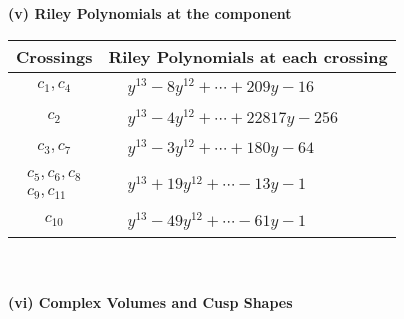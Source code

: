 \documentclass[1p]{elsarticle_modified}
\theoremstyle{definition}
\begin{document}
\newpage\renewcommand{\arraystretch}{1}
\flushleft \textbf{(v) Riley Polynomials at the component}\newline \\
\begin{tabular}{m{50pt}|m{274pt}}
Crossings & \hspace{64pt}Riley Polynomials at each crossing \\
\hline $$\begin{aligned}c_{1},c_{4}\end{aligned}$$&$\begin{aligned}
&y^{13}-8 y^{12}+\cdots+209 y-16
\end{aligned}$\\
\hline $$\begin{aligned}c_{2}\end{aligned}$$&$\begin{aligned}
&y^{13}-4 y^{12}+\cdots+22817 y-256
\end{aligned}$\\
\hline $$\begin{aligned}c_{3},c_{7}\end{aligned}$$&$\begin{aligned}
&y^{13}-3 y^{12}+\cdots+180 y-64
\end{aligned}$\\
\hline $$\begin{aligned}c_{5},c_{6},c_{8}\\c_{9},c_{11}\end{aligned}$$&$\begin{aligned}
&y^{13}+19 y^{12}+\cdots-13 y-1
\end{aligned}$\\
\hline $$\begin{aligned}c_{10}\end{aligned}$$&$\begin{aligned}
&y^{13}-49 y^{12}+\cdots-61 y-1
\end{aligned}$\\
\hline
\end{tabular}\\~\\
\newpage\flushleft \textbf{(vi) Complex Volumes and Cusp Shapes}
\end{document}

